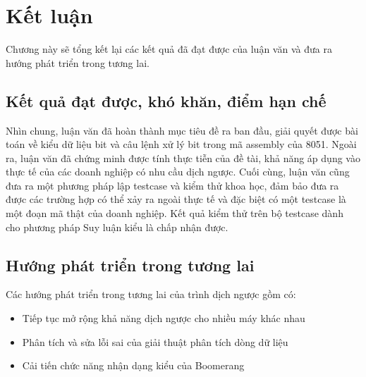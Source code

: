 \chapter{Kết luận}

Chương này sẽ tổng kết lại các kết quả đã đạt được của luận văn và đưa ra hướng phát triển trong tương lai.

\section{Kết quả đạt được, khó khăn, điểm hạn chế}

Nhìn chung, luận văn đã hoàn thành mục tiêu đề ra ban đầu, giải quyết được bài toán về kiểu dữ liệu bit và câu lệnh xử lý bit trong mã assembly của 8051. Ngoài ra, luận văn đã chứng minh được tính thực tiễn của đề tài, khả năng áp dụng vào thực tế của các doanh nghiệp có nhu cầu dịch ngược. Cuối cùng, luận văn cũng đưa ra một phương pháp lập testcase và kiểm thử khoa học, đảm bảo đưa ra được các trường hợp có thể xảy ra ngoài thực tế và đặc biệt có một testcase là một đoạn mã thật của doanh nghiệp. Kết quả kiểm thử trên bộ testcase dành cho phương pháp Suy luận kiểu là chấp nhận được.

\section{Hướng phát triển trong tương lai}

Các hướng phát triển trong tương lai của trình dịch ngược gồm có:

\begin{itemize}
	\item Tiếp tục mở rộng khả năng dịch ngược cho nhiều máy khác nhau
	\item Phân tích và sửa lỗi sai của giải thuật phân tích dòng dữ liệu
	\item Cải tiến chức năng nhận dạng kiểu của Boomerang
\end{itemize}
